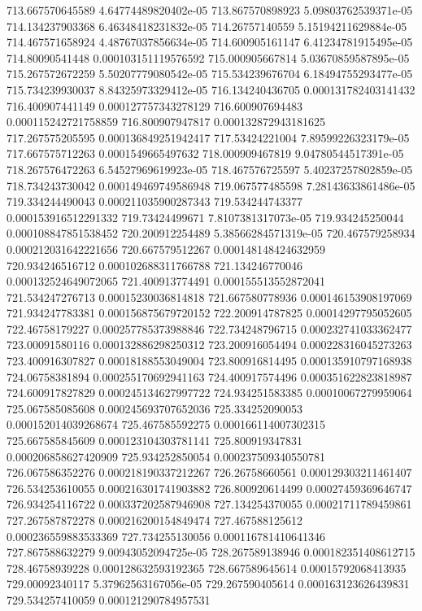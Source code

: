 {713.667570645589 4.64774489820402e-05
713.867570898923 5.09803762539371e-05
714.134237903368 6.46348418231832e-05
714.26757140559 5.15194211629884e-05
714.467571658924 4.48767037856634e-05
714.600905161147 6.41234781915495e-05
714.80090541448 0.000103151119576592
715.000905667814 5.03670859587895e-05
715.267572672259 5.50207779080542e-05
715.534239676704 6.18494755293477e-05
715.734239930037 8.84325973329412e-05
716.134240436705 0.000131782403141432
716.400907441149 0.000127757343278129
716.600907694483 0.000115242721758859
716.800907947817 0.000132872943181625
717.267575205595 0.000136849251942417
717.53424221004 7.89599226323179e-05
717.667575712263 0.0001549665497632
718.000909467819 9.04780544517391e-05
718.267576472263 6.54527969619923e-05
718.467576725597 5.40237257802859e-05
718.734243730042 0.000149469749586948
719.067577485598 7.28143633861486e-05
719.334244490043 0.000211035900287343
719.534244743377 0.000153916512291332
719.73424499671 7.8107381317073e-05
719.934245250044 0.000108847851538452
720.200912254489 5.38566284571319e-05
720.467579258934 0.000212031642221656
720.667579512267 0.000148148424632959
720.934246516712 0.000102688311766788
721.134246770046 0.000132524649072065
721.400913774491 0.000155513552872041
721.534247276713 0.00015230036814818
721.667580778936 0.000146153908197069
721.934247783381 0.000156875679720152
722.200914787825 0.00014297795052605
722.46758179227 0.000257785373988846
722.734248796715 0.000232741033362477
723.00091580116 0.000132886298250312
723.200916054494 0.000228316045273263
723.400916307827 0.00018188553049004
723.800916814495 0.000135910797168938
724.06758381894 0.000255170692941163
724.400917574496 0.000351622823818987
724.600917827829 0.000245134627997722
724.934251583385 0.00010067279959064
725.067585085608 0.000245693707652036
725.334252090053 0.000152014039268674
725.467585592275 0.000166114007302315
725.667585845609 0.000123104303781141
725.800919347831 0.000206858627420909
725.934252850054 0.000237509340550781
726.067586352276 0.000218190337212267
726.26758660561 0.000129303211461407
726.534253610055 0.000216301741903882
726.800920614499 0.00027459369646747
726.934254116722 0.000337202587946908
727.134254370055 0.00021711789459861
727.267587872278 0.000216200154849474
727.467588125612 0.000236559883533369
727.734255130056 0.000116781410641346
727.867588632279 9.00943052094725e-05
728.267589138946 0.000182351408612715
728.46758939228 0.000128632593192365
728.667589645614 0.00015792068413935
729.00092340117 5.37962563167056e-05
729.267590405614 0.000163123626439831
729.534257410059 0.000121290784957531
}
